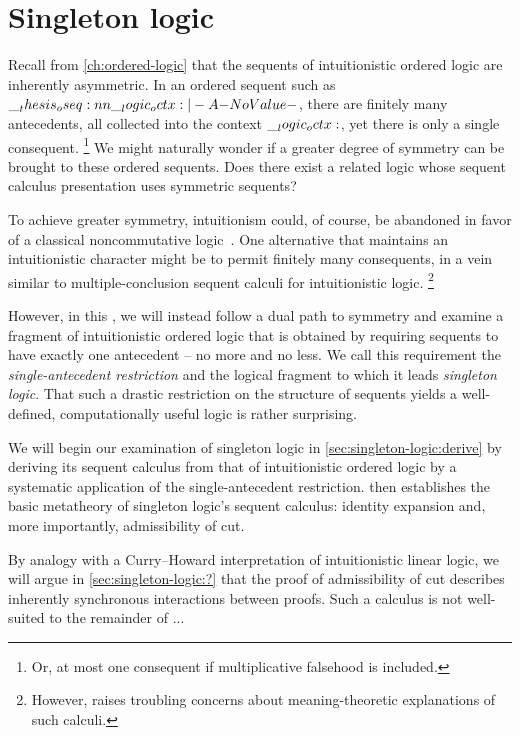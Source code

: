 \chapter{Singleton logic}\label{ch:singleton-logic}

Recall from \cref{ch:ordered-logic} that the sequents of intuitionistic ordered logic are inherently asymmetric.
In an ordered sequent such as $\oseq{\octx |- A}$, there are finitely many antecedents, all collected into the context $\__logic_octx:$, yet there is only a single consequent.%
\footnote{Or, at most one consequent if multiplicative falsehood is included.}
We might naturally wonder if a greater degree of symmetry can be brought to these ordered sequents.
Does there exist a related logic whose sequent calculus presentation uses symmetric sequents?

To achieve greater symmetry, intuitionism could, of course, be abandoned in favor of a classical noncommutative logic~\autocite{Abrusci:JSL91}.
One alternative that maintains an intuitionistic character might be to permit finitely many consequents, in a vein similar to multiple-conclusion sequent calculi for intuitionistic logic\autocite{??}.%
\footnote{However, \textcite{Steinberger:JPL11} raises troubling concerns about meaning-theoretic explanations of such calculi.}

However, in this , we will instead follow a dual path to symmetry and examine a fragment of intuitionistic ordered logic that is obtained by requiring sequents to have exactly one antecedent -- no more and no less.
We call this requirement the \emph{single-antecedent restriction} and the logical fragment to which it leads \emph{singleton logic}.
That such a drastic restriction on the structure of sequents yields a well-defined, computationally useful logic is rather surprising.

We will begin our examination of singleton logic in \cref{sec:singleton-logic:derive} by deriving its sequent calculus from that of intuitionistic ordered logic by a systematic application of the single-antecedent restriction.
 then establishes the basic metatheory of singleton logic's sequent calculus: identity expansion and, more importantly, admissibility of cut.

By analogy with a Curry--Howard interpretation of intuitionistic linear logic\autocite{Toninho:?}, we will argue in \cref{sec:singleton-logic:?} that the proof of admissibility of cut describes inherently synchronous interactions between proofs.
Such a calculus is not well-suited to the remainder of ...

